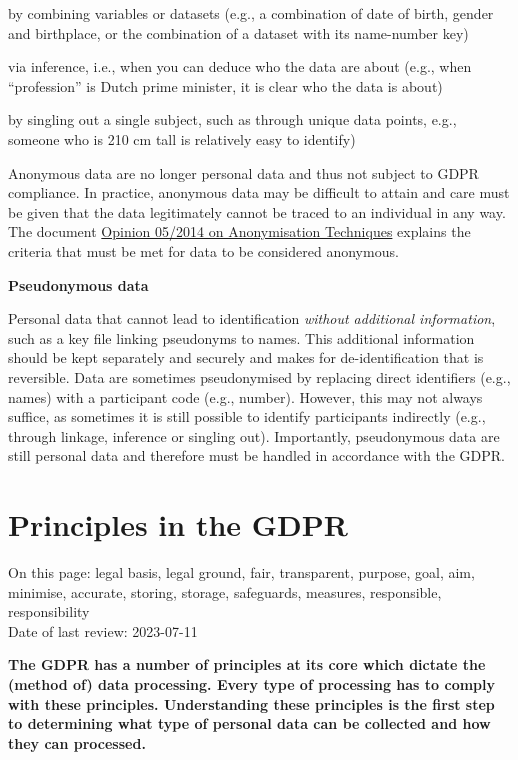 \documentclass[
]{book}
\begin{document}
by combining variables or datasets (e.g., a combination of date of birth, gender and birthplace, or the combination of a dataset with its name-number key)

via inference, i.e., when you can deduce who the data are about (e.g., when ``profession'' is Dutch prime minister, it is clear who the data is about)

by singling out a single subject, such as through unique data points, e.g., someone who is 210 cm tall is relatively easy to identify)

Anonymous data are no longer personal data and thus not subject to GDPR
compliance. In practice, anonymous data may be difficult to attain and care must be given that the data legitimately cannot be traced to an individual in any way. The document \href{https://ec.europa.eu/justice/article-29/documentation/opinion-recommendation/files/2014/wp216_en.pdf}{Opinion 05/2014 on Anonymisation Techniques} explains the criteria that must be met for data to be considered anonymous.

\textbf{Pseudonymous data}

Personal data that cannot lead to identification \emph{without additional information}, such as a key file linking pseudonyms to names. This additional information should be kept separately and securely and makes for de-identification that is reversible. Data are sometimes pseudonymised by replacing direct identifiers (e.g., names) with a participant code (e.g., number). However, this may not always suffice, as sometimes it is still possible to identify participants indirectly (e.g., through linkage, inference or singling out). Importantly, pseudonymous data are still personal data and therefore must be handled in accordance with the GDPR.

\hypertarget{gdpr-principles}{%
\section{Principles in the GDPR}\label{gdpr-principles}}

On this page: legal basis, legal ground, fair, transparent, purpose, goal, aim,
minimise, accurate, storing, storage, safeguards, measures, responsible,
responsibility\\
Date of last review: 2023-07-11

\textbf{The GDPR has a number of principles at its core which dictate the (method of)
data processing. Every type of processing has to comply with these principles.
Understanding these principles is the first step to determining what type of
personal data can be collected and how they can processed.}
\end{document}

